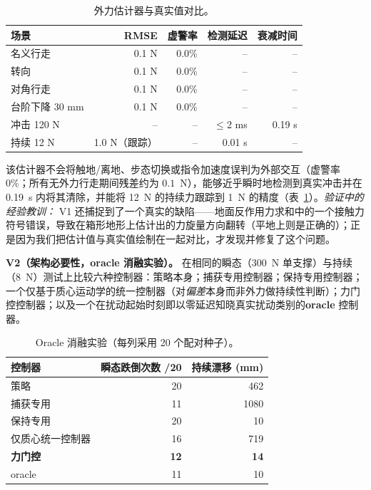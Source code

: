 \documentclass[journal]{IEEEtran}
\begin{document}
\begin{table}[t]
\caption{外力估计器与真实值对比。}
\label{tab:estimator}
\centering
\begin{tabular}{lrrrr}
\hline
场景 & RMSE & 虚警率 & 检测延迟 & 衰减时间\\
\hline
名义行走 & 0.1 N & 0.0\% & -- & --\\
转向 & 0.1 N & 0.0\% & -- & --\\
对角行走 & 0.1 N & 0.0\% & -- & --\\
台阶下降 30 mm & 0.1 N & 0.0\% & -- & --\\
冲击 120 N & -- & -- & $\le$2 ms & 0.19 s\\
持续 12 N & 1.0 N（跟踪） & -- & 0.01 s & --\\
\hline
\end{tabular}
\end{table}

该估计器不会将触地/离地、步态切换或指令加速度误判为外部交互（虚警率 0\%；所有无外力行走期间残差约为 $0.1$~N），能够近乎瞬时地检测到真实冲击并在 0.19~s 内将其清除，并能将 12~N 的持续力跟踪到 1~N 的精度（表~\ref{tab:estimator}）。\emph{验证中的经验教训：} V1 还捕捉到了一个真实的缺陷——地面反作用力求和中的一个接触力符号错误，导致在箱形地形上估计出的力旋量方向翻转（平地上则是正确的）；正是因为我们把估计值与真实值绘制在一起对比，才发现并修复了这个问题。

\textbf{V2（架构必要性，oracle 消融实验）。} 在相同的瞬态（300~N 单支撑）与持续（8~N）测试上比较六种控制器：策略本身；捕获专用控制器；保持专用控制器；一个仅基于质心运动学的统一控制器（对\emph{偏差}本身而非外力做持续性判断）；力门控控制器；以及一个在扰动起始时刻即以零延迟知晓真实扰动类别的\textbf{oracle} 控制器。

\begin{table}[t]
\caption{Oracle 消融实验（每列采用 20 个配对种子）。}
\label{tab:ablation}
\centering
\begin{tabular}{lrr}
\hline
控制器 & 瞬态跌倒次数 /20 & 持续漂移 (mm)\\
\hline
策略 & 20 & 462\\
捕获专用 & 11 & 1080\\
保持专用 & 20 & 10\\
仅质心统一控制器 & 16 & 719\\
\textbf{力门控} & \textbf{12} & \textbf{14}\\
oracle & 11 & 10\\
\hline
\end{tabular}
\end{table}
\end{document}
